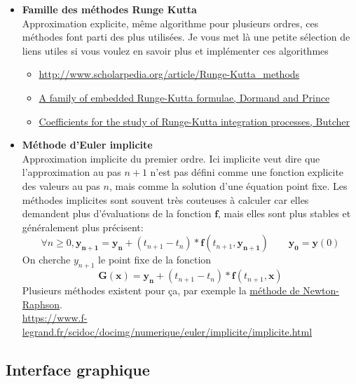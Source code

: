 \documentclass{article}
\newcommand{\myvec}[1]{\ensuremath{\mathbf{#1}}}
\begin{document}
\begin{itemize}
    \item \textbf{Famille des méthodes Runge Kutta} \\
    Approximation explicite, même algorithme pour plusieurs ordres, ces méthodes font parti des plus utilisées. Je vous met là une petite sélection de liens utiles si vous voulez en savoir plus et implémenter ces algorithmes
    \begin{itemize}
        \item \url{http://www.scholarpedia.org/article/Runge-Kutta_methods}
        \item \href{https://core.ac.uk/download/pdf/81989096.pdf}{A family of embedded Runge-Kutta formulae, Dormand and Prince}
        \item \href{https://www.researchgate.net/publication/231910159_Coefficients_for_the_study_of_Runge-Kutta_integration_processes}{Coefficients for the study of Runge-Kutta integration processes, Butcher}
    \end{itemize}

    \item \textbf{Méthode d'Euler implicite} \\
    Approximation implicite du premier ordre. Ici implicite veut dire que l'approximation au pas $n+1$ n'est pas défini comme une fonction explicite des valeurs au pas $n$, mais comme la solution d'une équation point fixe. Les méthodes implicites sont souvent très couteuses à calculer car elles demandent plus d'évaluations de la fonction $\myvec{f}$, mais elles sont plus stables et généralement plus précisent:
    \begin{equation*}
        \forall n \ge 0, \myvec{y_{n+1}} = \myvec{y_n} + (t_{n+1} - t_n) * \myvec{f}(t_{n+1}, \myvec{y_{n+1}}) \quad\quad \myvec{y_0} = \myvec{y}(0)
    \end{equation*}
    On cherche $y_{n+1}$ le point fixe de la fonction
        \[\myvec{G}(\myvec{x}) = \myvec{y_n} + (t_{n+1} - t_n) * \myvec{f}(t_{n+1}, \myvec{x})\]
    Plusieurs méthodes existent pour ça, par exemple la \href{https://en.wikipedia.org/wiki/Newton\%27s_method}{méthode de Newton-Raphson}. \\
    \url{https://www.f-legrand.fr/scidoc/docimg/numerique/euler/implicite/implicite.html}
\end{itemize}

\subsection{Interface graphique}
\label{interface}
\end{document}
